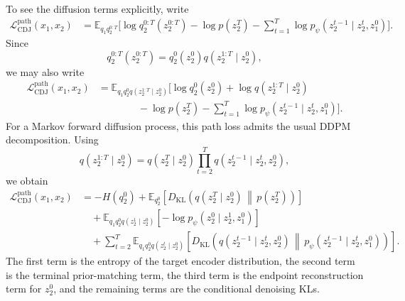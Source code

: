 \documentclass{article}
\newcommand{\E}{\mathbb{E}}
\newcommand{\KL}{D_{\mathrm{KL}}}
\begin{document}
To see the diffusion terms explicitly, write
\begin{align}
\mathcal L_{\mathrm{CDJ}}^{\mathrm{path}}(x_1,x_2)
&=
\E_{q_1 q_2^{0:T}}
\Bigg[
\log q_2^{0:T}(z_2^{0:T})
-
\log p(z_2^T)
-
\sum_{t=1}^{T}
\log p_\psi(z_2^{t-1}\mid z_2^t,z_1^0)
\Bigg].
\label{eq:cdj-path-loss-log-ratio}
\end{align}
Since
\[
q_2^{0:T}(z_2^{0:T})
=
q_2^0(z_2^0)q(z_2^{1:T}\mid z_2^0),
\]
we may also write
\begin{align}
\mathcal L_{\mathrm{CDJ}}^{\mathrm{path}}(x_1,x_2)
&=
\E_{q_1 q_2^0 q(z_2^{1:T}\mid z_2^0)}
\Bigg[
\log q_2^0(z_2^0)
+
\log q(z_2^{1:T}\mid z_2^0)
\nonumber \\
&\qquad\qquad
-
\log p(z_2^T)
-
\sum_{t=1}^{T}
\log p_\psi(z_2^{t-1}\mid z_2^t,z_1^0)
\Bigg].
\label{eq:cdj-path-loss-forward-expanded}
\end{align}
For a Markov forward diffusion process, this path loss admits the usual DDPM
decomposition. Using
\[
q(z_2^{1:T}\mid z_2^0)
=
q(z_2^T\mid z_2^0)
\prod_{t=2}^{T}
q(z_2^{t-1}\mid z_2^t,z_2^0),
\]
we obtain
\begin{align}
\mathcal L_{\mathrm{CDJ}}^{\mathrm{path}}(x_1,x_2)
&=
-H(q_2^0)
+
\E_{q_2^0}
\left[
\KL
\left(
q(z_2^T\mid z_2^0)
\,\middle\|\,
p(z_2^T)
\right)
\right]
\nonumber \\
&\quad
+
\E_{q_1 q_2^0 q(z_2^1\mid z_2^0)}
\left[
-\log p_\psi(z_2^0\mid z_2^1,z_1^0)
\right]
\nonumber \\
&\quad
+
\sum_{t=2}^{T}
\E_{q_1 q_2^0 q(z_2^t\mid z_2^0)}
\left[
\KL
\left(
q(z_2^{t-1}\mid z_2^t,z_2^0)
\,\middle\|\,
p_\psi(z_2^{t-1}\mid z_2^t,z_1^0)
\right)
\right].
\label{eq:cdj-path-loss-ddpm-expanded}
\end{align}
The first term is the entropy of the target encoder distribution, the second
term is the terminal prior-matching term, the third term is the endpoint
reconstruction term for $z_2^0$, and the remaining terms are the conditional
denoising KLs.
\end{document}
